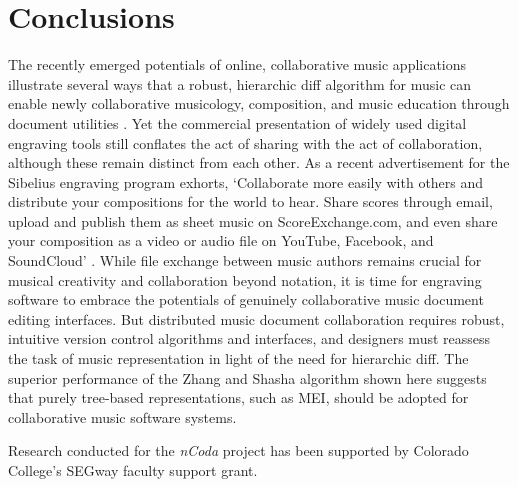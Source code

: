 \documentclass{article}
\begin{document}


\section{Conclusions}
The recently emerged potentials of online, collaborative music applications illustrate several ways that a robust, hierarchic diff algorithm for music can enable newly collaborative musicology, composition, and music education through document utilities \cite{Martin:2015pb,McCulloch:2015pd,Flat:aa,Baca:2015xr}.
Yet the commercial presentation of widely used digital engraving tools still conflates the act of sharing with the act of collaboration,
although these remain distinct from each other.
As a recent advertisement for the Sibelius engraving program exhorts,
`Collaborate more easily with others and distribute your compositions for the world to hear.
Share scores through email, upload and publish them as sheet music on ScoreExchange.com,
and even share your composition as a video or audio file on YouTube, Facebook, and SoundCloud' \cite{Avid:to}.
While file exchange between music authors remains crucial for musical creativity and collaboration beyond notation,
it is time for engraving software to embrace the potentials of genuinely collaborative music document editing interfaces. But distributed music document collaboration requires robust, intuitive version control algorithms and interfaces, and designers must reassess the task of music representation in light of the need for hierarchic diff. The superior performance of the Zhang and Shasha algorithm shown here suggests that purely tree-based representations, such as MEI, should be adopted for collaborative music software systems.

%
\begin{acknowledgments}
Research conducted for the \emph{nCoda} project has been supported by Colorado College's SEGway faculty support grant.
\end{acknowledgments}

\balance

\end{document}
